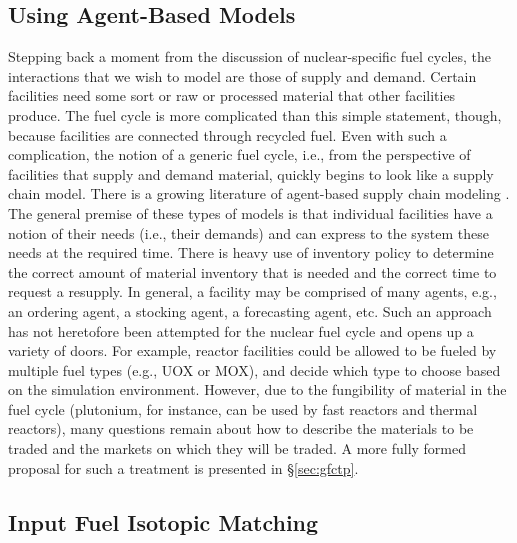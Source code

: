 \subsection{Using Agent-Based Models}

Stepping back a moment from the discussion of nuclear-specific fuel cycles, the
interactions that we wish to model are those of supply and demand. Certain
facilities need some sort or raw or processed material that other facilities
produce. The fuel cycle is more complicated than this simple statement, though,
because facilities are connected through recycled fuel. Even with such a
complication, the notion of a generic fuel cycle, i.e., from the perspective of
facilities that supply and demand material, quickly begins to look like a supply
chain model. There is a growing literature of agent-based supply chain modeling
\cite{swaminathan_modeling_1998,julka_agent-based_2002,van_der_zee_modeling_2005,chatfield_multi-formalism_2007,holmgren_agent_2007}.
The general premise of these types of models is that individual facilities have
a notion of their needs (i.e., their demands) and can express to the system
these needs at the required time. There is heavy use of inventory policy to
determine the correct amount of material inventory that is needed and the
correct time to request a resupply. In general, a facility may be comprised of
many agents, e.g., an ordering agent, a stocking agent, a forecasting agent,
etc. Such an approach has not heretofore been attempted for the nuclear fuel
cycle and opens up a variety of doors. For example, reactor facilities could be
allowed to be fueled by multiple fuel types (e.g., UOX or MOX), and decide which
type to choose based on the simulation environment. However, due to the
fungibility of material in the fuel cycle (plutonium, for instance, can be used
by fast reactors and thermal reactors), many questions remain about how to
describe the materials to be traded and the markets on which they will be
traded. A more fully formed proposal for such a treatment is presented in
\S\ref{sec:gfctp}.

\subsection{Input Fuel Isotopic Matching}

